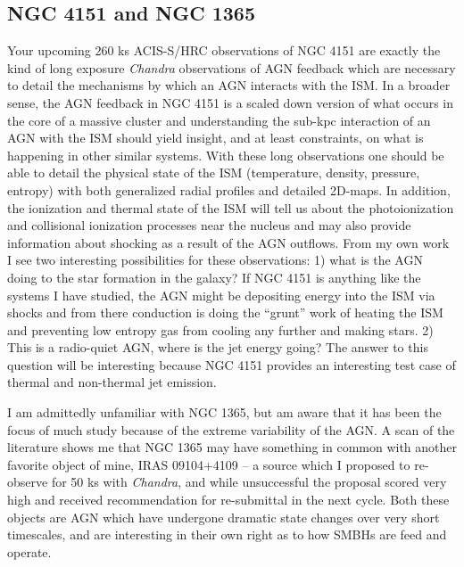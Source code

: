 \documentclass[11pt]{article}
\begin{document}
\subsection*{NGC 4151 and NGC 1365}
Your upcoming 260 ks ACIS-S/HRC observations of NGC 4151 are exactly the
kind of long exposure {\it Chandra} observations of AGN feedback which
are necessary to detail the mechanisms by which an AGN interacts with
the ISM. In a broader sense, the AGN feedback in NGC 4151 is a scaled
down version of what occurs in the core of a massive cluster and
understanding the sub-kpc interaction of an AGN with the ISM should
yield insight, and at least constraints, on what is happening in other
similar systems. With these long observations one should be able to
detail the physical state of the ISM (temperature, density, pressure,
entropy) with both generalized radial profiles and detailed
2D-maps. In addition, the ionization and thermal state of the
ISM will tell us about the photoionization and collisional ionization
processes near the nucleus and may also provide information about
shocking as a result of the AGN outflows. From my own work I see
two interesting possibilities for these observations: 1) what is the
AGN doing to the star formation in the galaxy? If NGC 4151 is anything
like the systems I have studied, the AGN might be depositing energy
into the ISM via shocks and from there conduction is doing the
``grunt'' work of heating the ISM and preventing low entropy gas from
cooling any further and making stars. 2) This is a radio-quiet AGN,
where is the jet energy going? The answer to this question will be
interesting because NGC 4151 provides an interesting test case of
thermal and non-thermal jet emission.

I am admittedly unfamiliar with NGC 1365, but am aware that it has
been the focus of much study because of the extreme variability of the
AGN. A scan of the literature shows me that NGC 1365 may have
something in common with another favorite object of mine, IRAS
09104+4109 -- a source which I proposed to re-observe for 50 ks with {\it
Chandra}, and while unsuccessful the proposal scored very high and
received recommendation for re-submittal in the next cycle. Both these
objects are AGN which have undergone dramatic state changes over very
short timescales, and are interesting in their own right as to how
SMBHs are feed and operate.
\end{document}
